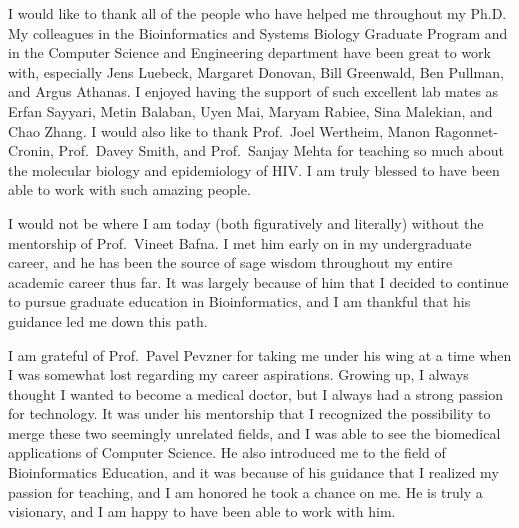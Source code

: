 \begin{frontmatter}
\tableofcontents

\newpage
{}
\begin{center}\expandafter\MakeUppercase\expandafter{\abbrevtitle}\end{center}
\let\clearpage\relax
\vspace*{-2cm}
\printglossary[type=\acronymtype,title={}]


\listoffigures
\listoftables


\begin{acknowledgements}
I would like to thank all of the people who have helped me throughout my Ph.D. My colleagues in the Bioinformatics and Systems Biology Graduate Program and in the Computer Science and Engineering department have been great to work with, especially Jens Luebeck, Margaret Donovan, Bill Greenwald, Ben Pullman, and Argus Athanas. I enjoyed having the support of such excellent lab mates as Erfan Sayyari, Metin Balaban, Uyen Mai, Maryam Rabiee, Sina Malekian, and Chao Zhang.
I would also like to thank Prof.~Joel Wertheim, Manon Ragonnet-Cronin, Prof.~Davey Smith, and Prof.~Sanjay Mehta for teaching so much about the molecular biology and epidemiology of HIV.
I am truly blessed to have been able to work with such amazing people.

I would not be where I am today (both figuratively and literally) without the mentorship of Prof.~Vineet Bafna. I met him early on in my undergraduate career, and he has been the source of sage wisdom throughout my entire academic career thus far. It was largely because of him that I decided to continue to pursue graduate education in Bioinformatics, and I am thankful that his guidance led me down this path.

I am grateful of Prof.~Pavel Pevzner for taking me under his wing at a time when I was somewhat lost regarding my career aspirations. Growing up, I always thought I wanted to become a medical doctor, but I always had a strong passion for technology. It was under his mentorship that I recognized the possibility to merge these two seemingly unrelated fields, and I was able to see the biomedical applications of Computer Science. He also introduced me to the field of Bioinformatics Education, and it was because of his guidance that I realized my passion for teaching, and I am honored he took a chance on me. He is truly a visionary, and I am happy to have been able to work with him.


\end{acknowledgements}
\end{frontmatter}
